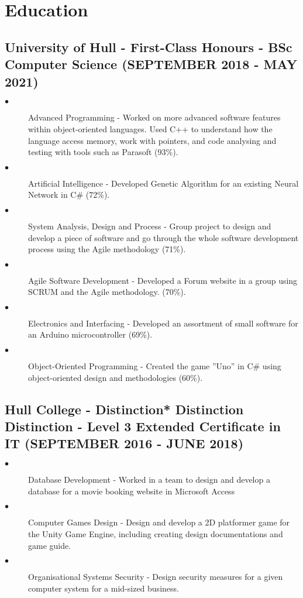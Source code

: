 \documentclass{article}
\begin{document}
\section{Education}
\noindent
\hfill
\begin{minipage}[t]{1\textwidth}
    \subsection{University of Hull - First-Class Honours \textnormal{- BSc Computer Science} \footnotesize{(SEPTEMBER 2018 - MAY 2021)}}
    \normalsize{}
    \begin{description}
        \item[$\bullet$]Advanced Programming - Worked on more advanced software features within object-oriented languages. Used C++ to understand how the language access memory, work with pointers, and code analysing and testing with tools such as Parasoft (93\%).
        \item[$\bullet$]Artificial Intelligence - Developed Genetic Algorithm for an existing Neural Network in C\# (72\%).
        \item[$\bullet$]System Analysis, Design and Process - Group project to design and develop a piece of software and go through the whole software development process using the Agile methodology (71\%).
        \item[$\bullet$]Agile Software Development - Developed a Forum website in a group using SCRUM and the Agile methodology. (70\%).
        \item[$\bullet$]Electronics and Interfacing - Developed an assortment of small software for an Arduino microcontroller (69\%).
        \item[$\bullet$]Object-Oriented Programming - Created the game ”Uno” in C\# using object-oriented design and methodologies (60\%).
    \end{description}
    \subsection{Hull College - Distinction* Distinction Distinction \textnormal{- Level 3 Extended Certificate in IT} \footnotesize{(SEPTEMBER 2016 - JUNE 2018)}}
    \normalsize{}
    \begin{description}
        \item[$\bullet$]Database Development - Worked in a team to design and develop a database for a movie booking website in Microsoft Access
        \item[$\bullet$]Computer Games Design - Design and develop a 2D platformer game for the Unity Game Engine, including creating design documentations and game guide.
        \item[$\bullet$]Organisational Systems Security - Design security measures for a given computer system for a mid-sized business. 
    \end{description}

\end{minipage}
\end{document}
